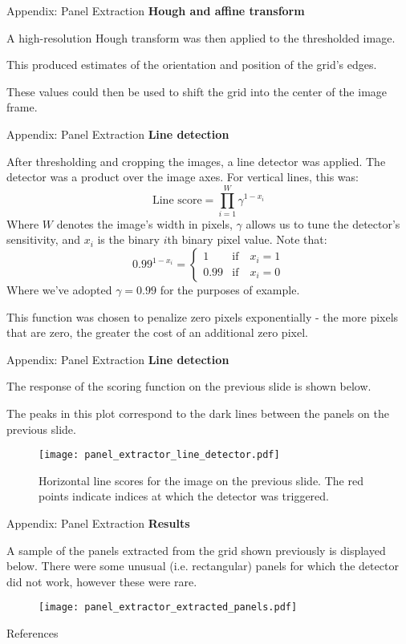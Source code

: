 \documentclass[10pt]{beamer}
\begin{document}
\begin{frame}{Appendix: Panel Extraction}
	\textbf{Hough and affine transform}
	
	A high-resolution Hough transform was then applied to the thresholded image.
	
	 This produced estimates of the orientation and position of the grid's edges. 
	 
	 These values could then be used to shift the grid into the center of the image frame.
\end{frame}

\begin{frame}{Appendix: Panel Extraction}
	\textbf{Line detection}

	After thresholding and cropping the images, a line detector was applied. The detector was a product over the image axes. For vertical lines, this was:
	\[
		\text{Line score} = \prod_{i = 1}^{W} \gamma^{1 - x_i}
	\]
	Where $W$ denotes the image's width in pixels, $\gamma$ allows us to tune the detector's sensitivity, and $x_i$ is the binary $i$th binary pixel value. Note that:
	\[
		0.99^{1 - x_i} = \begin{cases}
					1 & \text{if} \quad x_i = 1 \\
					0.99 & \text{if} \quad x_i = 0
				      \end{cases}
	\]
	Where we've adopted $\gamma = 0.99$ for the purposes of example. 
	
	This function was chosen to penalize zero pixels exponentially - the more pixels that are zero, the greater the cost of an additional zero pixel.
\end{frame}

\begin{frame}{Appendix: Panel Extraction}
	\textbf{Line detection}
	
	The response of the scoring function on the previous slide is shown below.

	 The peaks in this plot correspond to the dark lines between the panels on the previous slide.
	\begin{figure}[b]
		\texttt{[image: panel\_extractor\_line\_detector.pdf]}
		\caption{Horizontal line scores for the image on the previous slide. The red points indicate indices at which the detector was triggered.}
	\end{figure}
\end{frame}

\begin{frame}{Appendix: Panel Extraction}
	\textbf{Results}
	
	A sample of the panels extracted from the grid shown previously is displayed below. There were some unusual (i.e. rectangular) panels for which the detector did not work, however these were rare.

	\begin{figure}[b]
		\texttt{[image: panel\_extractor\_extracted\_panels.pdf]}
	\end{figure}
\end{frame}


\begin{frame}[allowframebreaks]{References}

  
  

\end{frame}
\end{document}
